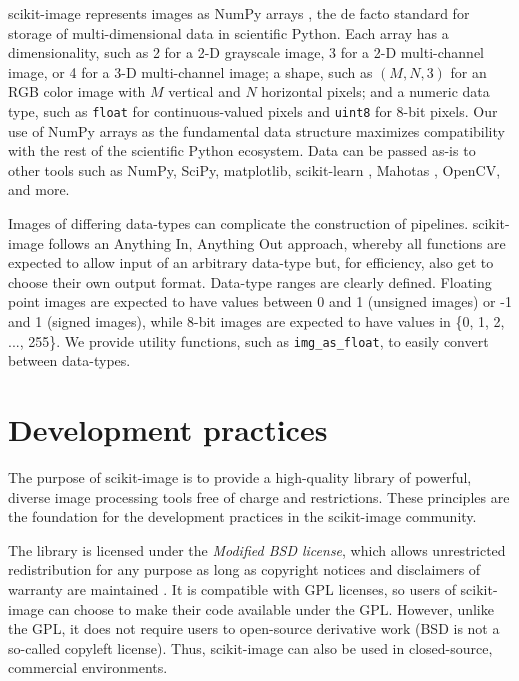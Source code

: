 \documentclass[fleqn,12pt]{wlpeerj}
\begin{document}
scikit-image represents images as NumPy arrays \citep{numpy}, the de facto standard for storage of multi-dimensional data in scientific Python. Each array has a dimensionality, such as 2 for a 2-D grayscale image, 3 for a 2-D multi-channel image, or 4 for a 3-D multi-channel image; a shape, such as $(M, N, 3)$ for an RGB color image with $M$ vertical and $N$ horizontal pixels; and a numeric data type, such as \texttt{float} for continuous-valued pixels and \texttt{uint8} for 8-bit pixels. Our use of NumPy arrays as the fundamental data structure maximizes compatibility with the rest of the scientific Python ecosystem. Data can be passed as-is to other tools such as NumPy, SciPy, matplotlib, scikit-learn \citep{scikit-learn}, Mahotas \citep{Mahotas}, OpenCV, and more.

Images of differing data-types can complicate the construction of pipelines. scikit-image follows an \textquotedbl{}Anything In, Anything Out\textquotedbl{} approach, whereby all functions are expected to allow input of an arbitrary data-type but, for efficiency, also get to choose their own output format. Data-type ranges are clearly defined. Floating point images are expected to have values between 0 and 1 (unsigned images) or -1 and 1 (signed images), while 8-bit images are expected to have values in \{0, 1, 2, ..., 255\}. We provide utility functions, such as \texttt{img\_as\_float}, to easily convert between data-types.



\section*{Development practices}
\label{sec:development-practices}

The purpose of scikit-image is to provide a high-quality library of powerful, diverse image processing tools free of charge and restrictions. These principles are the foundation for the development practices in the scikit-image community.

The library is licensed under the \emph{Modified BSD license}, which allows unrestricted redistribution for any purpose as long as copyright notices and disclaimers of warranty are maintained \citep{BSD}. It is compatible with GPL licenses, so users of scikit-image can choose to make their code available under the GPL. However, unlike the GPL, it does not require users to open-source derivative work (BSD is not a so-called copyleft license). Thus, scikit-image can also be used in closed-source, commercial environments.
\end{document}

